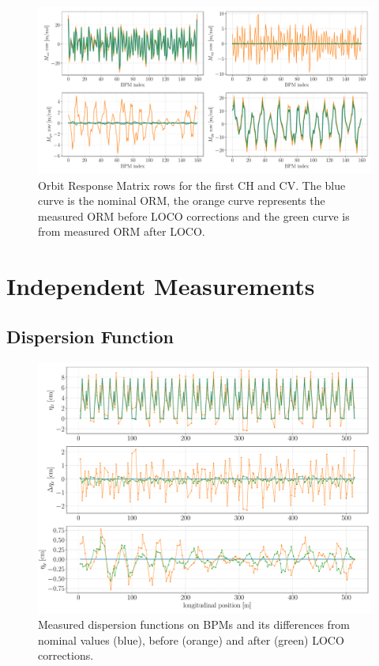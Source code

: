 \begin{figure}
\centering
\includegraphics[width=1.0\textwidth]{figures/nominal_measured_after_before_loco_grid.pdf}
\caption{Orbit Response Matrix rows for the first CH and CV. The blue curve is the nominal ORM, the orange curve represents the measured ORM before LOCO corrections and the green curve is from measured ORM after LOCO.}
\label{fig:orm_rows}
\end{figure}



\section{Independent Measurements}
\subsection{Dispersion Function}

\begin{figure}
\centering
\includegraphics[width=1.0\textwidth]{figures/dispersion_after_before_loco_grid2.pdf}
\caption{Measured dispersion functions on BPMs and its differences from nominal values (blue), before (orange) and after (green) LOCO corrections.}
\label{fig:disp_error}
\end{figure}



